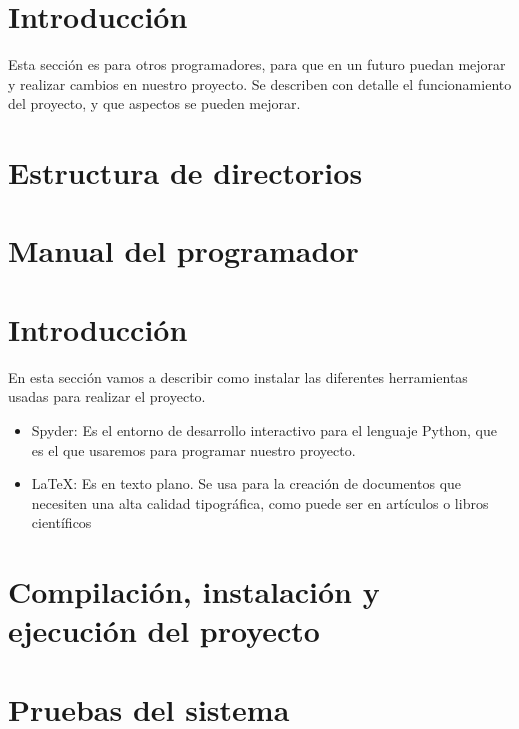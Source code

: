 
\section{Introducción}
Esta sección es para otros programadores, para que en un futuro puedan mejorar y realizar cambios en nuestro proyecto. Se describen con detalle el funcionamiento del proyecto, y que aspectos se pueden mejorar.

\section{Estructura de directorios}

\section{Manual del programador}
\section{Introducción}
En esta sección vamos a describir como instalar las diferentes herramientas usadas para realizar el proyecto.

\begin{itemize}
\item Spyder: Es el entorno de desarrollo interactivo para el lenguaje Python, que es el que usaremos para programar nuestro proyecto.

\item LaTeX: Es en texto plano. Se usa para la creación de documentos que necesiten una alta calidad tipográfica, como puede ser en artículos o libros científicos

\end{itemize}


\section{Compilación, instalación y ejecución del proyecto}

\section{Pruebas del sistema}
